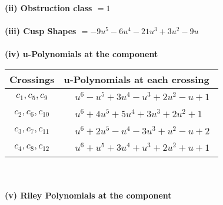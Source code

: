 \documentclass[1p]{elsarticle_modified}
\theoremstyle{definition}
\begin{document}
\flushleft \textbf{(ii) Obstruction class $= 1$}\\~\\
\flushleft \textbf{(iii) Cusp Shapes $= -9 u^5-6 u^4-21 u^3+3 u^2-9 u$}\\~\\
\newpage\renewcommand{\arraystretch}{1}
\flushleft \textbf{(iv) u-Polynomials at the component}\newline \\
\begin{tabular}{m{50pt}|m{274pt}}
Crossings & \hspace{64pt}u-Polynomials at each crossing \\
\hline $$\begin{aligned}c_{1},c_{5},c_{9}\end{aligned}$$&$\begin{aligned}
&u^6- u^5+3 u^4- u^3+2 u^2- u+1
\end{aligned}$\\
\hline $$\begin{aligned}c_{2},c_{6},c_{10}\end{aligned}$$&$\begin{aligned}
&u^6+4 u^5+5 u^4+3 u^3+2 u^2+1
\end{aligned}$\\
\hline $$\begin{aligned}c_{3},c_{7},c_{11}\end{aligned}$$&$\begin{aligned}
&u^6+2 u^5- u^4-3 u^3+u^2- u+2
\end{aligned}$\\
\hline $$\begin{aligned}c_{4},c_{8},c_{12}\end{aligned}$$&$\begin{aligned}
&u^6+u^5+3 u^4+u^3+2 u^2+u+1
\end{aligned}$\\
\hline
\end{tabular}\\~\\
\newpage\renewcommand{\arraystretch}{1}
\flushleft \textbf{(v) Riley Polynomials at the component}\newline \\
\end{document}
